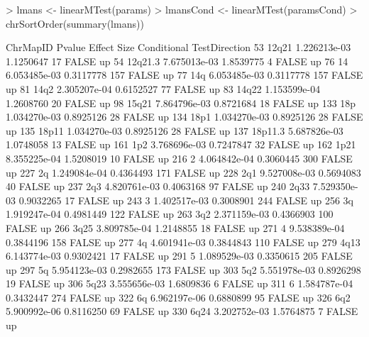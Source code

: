 \documentclass[11pt]{article}
\begin{document}
\begin{Schunk}
\begin{Sinput}
> lmans <- linearMTest(params)
> lmansCond <- linearMTest(paramsCond)
> chrSortOrder(summary(lmans))
\end{Sinput}
\begin{Soutput}
     ChrMapID       Pvalue    Effect Size Conditional TestDirection
53      12q21 1.226213e-03 1.1250647   17       FALSE            up
54    12q21.3 7.675013e-03 1.8539775    4       FALSE            up
76         14 6.053485e-03 0.3117778  157       FALSE            up
77        14q 6.053485e-03 0.3117778  157       FALSE            up
81       14q2 2.305207e-04 0.6152527   77       FALSE            up
83      14q22 1.153599e-04 1.2608760   20       FALSE            up
98      15q21 7.864796e-03 0.8721684   18       FALSE            up
133       18p 1.034270e-03 0.8925126   28       FALSE            up
134      18p1 1.034270e-03 0.8925126   28       FALSE            up
135     18p11 1.034270e-03 0.8925126   28       FALSE            up
137   18p11.3 5.687826e-03 1.0748058   13       FALSE            up
161       1p2 3.768696e-03 0.7247847   32       FALSE            up
162      1p21 8.355225e-04 1.5208019   10       FALSE            up
216         2 4.064842e-04 0.3060445  300       FALSE            up
227        2q 1.249084e-04 0.4364493  171       FALSE            up
228       2q1 9.527008e-03 0.5694083   40       FALSE            up
237       2q3 4.820761e-03 0.4063168   97       FALSE            up
240      2q33 7.529350e-03 0.9032265   17       FALSE            up
243         3 1.402517e-03 0.3008901  244       FALSE            up
256        3q 1.919247e-04 0.4981449  122       FALSE            up
263       3q2 2.371159e-03 0.4366903  100       FALSE            up
266      3q25 3.809785e-04 1.2148855   18       FALSE            up
271         4 9.538389e-04 0.3844196  158       FALSE            up
277        4q 4.601941e-03 0.3844843  110       FALSE            up
279      4q13 6.143774e-03 0.9302421   17       FALSE            up
291         5 1.089529e-03 0.3350615  205       FALSE            up
297        5q 5.954123e-03 0.2982655  173       FALSE            up
303       5q2 5.551978e-03 0.8926298   19       FALSE            up
306      5q23 3.555656e-03 1.6809836    6       FALSE            up
311         6 1.584787e-04 0.3432447  274       FALSE            up
322        6q 6.962197e-06 0.6880899   95       FALSE            up
326       6q2 5.900992e-06 0.8116250   69       FALSE            up
330      6q24 3.202752e-03 1.5764875    7       FALSE            up

\end{Soutput}
\end{Schunk}
\end{document}
